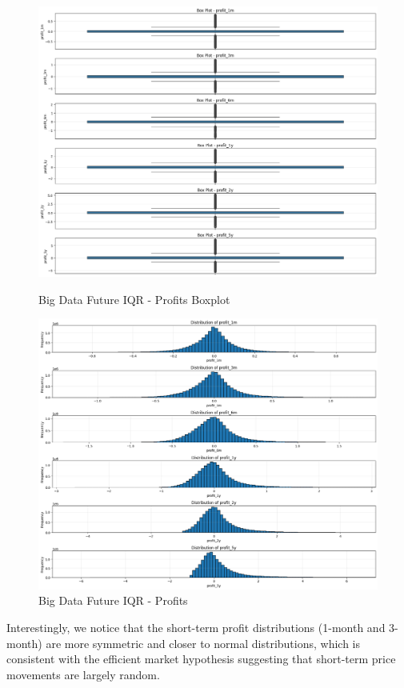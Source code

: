 \documentclass[11pt,english,a4paper,hidelinks]{book}
\begin{document}
\begin{figure}[H]
    \centering
    \begin{minipage}{0.48\textwidth}
        \centering
        \includegraphics[width=0.8\linewidth]{images/code/descriptive analysis/distributions/Big Data future IQR - Profits Boxplot.png}
        \caption{Big Data Future IQR - Profits Boxplot}
        \label{fig:big_data_future_iqr_profits_boxplot}
    \end{minipage}\hfill
    \begin{minipage}{0.48\textwidth}
        \centering
        \includegraphics[width=0.8\linewidth]{images/code/descriptive analysis/distributions/Big Data Future IQR - Profits.png}
        \caption{Big Data Future IQR - Profits}
        \label{fig:big_data_future_iqr_profits_iqr}
    \end{minipage}
\end{figure}


\vspace{0.5cm}
\noindent Interestingly, we notice that the short-term profit distributions (1-month and 3-month) are more symmetric and closer to normal distributions, which is consistent with the efficient market hypothesis suggesting that short-term price movements are largely random. 
\end{document}
